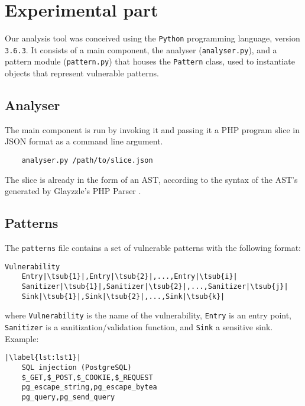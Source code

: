 \section*{Experimental part}
\label{sec:expr}

Our analysis tool was conceived using the \verb|Python| programming language,
version \verb|3.6.3|. It consists of a main component, the analyser
(\verb|analyser.py|), and a pattern module (\verb|pattern.py|) that houses the
\verb|Pattern| class, used to instantiate objects that represent vulnerable
patterns.

\subsection*{Analyser}
\label{sec:expr.analyser}

The main component is run by invoking it and passing it a PHP program slice in
JSON format as a command line argument.

\begin{verbatim}
    analyser.py /path/to/slice.json
\end{verbatim}

The slice is already in the form of an AST, according to the syntax of the AST's
generated by Glayzzle's PHP Parser \cite{glayzzle-php}.

\subsection*{Patterns}
\label{sec:expr.patterns}

The \verb|patterns| file contains a set of vulnerable patterns with the
following format:

\begin{lstlisting}[label={lst:pat.tmpl},
        caption={Vulnerable pattern template}]
    Vulnerability
    Entry|\tsub{1}|,Entry|\tsub{2}|,...,Entry|\tsub{i}|
    Sanitizer|\tsub{1}|,Sanitizer|\tsub{2}|,...,Sanitizer|\tsub{j}|
    Sink|\tsub{1}|,Sink|\tsub{2}|,...,Sink|\tsub{k}|
\end{lstlisting}

where \verb|Vulnerability| is the name of the vulnerability, \verb|Entry| is an
entry point, \verb|Sanitizer| is a sanitization/validation function, and
\verb|Sink| a sensitive sink. Example:

\begin{lstlisting}[label={lst:pat.ex},
        caption={SQL Injection pattern, specific to PostgreSQL}]
    |\label{lst:lst1}|
    SQL injection (PostgreSQL)
    $_GET,$_POST,$_COOKIE,$_REQUEST
    pg_escape_string,pg_escape_bytea
    pg_query,pg_send_query
\end{lstlisting}